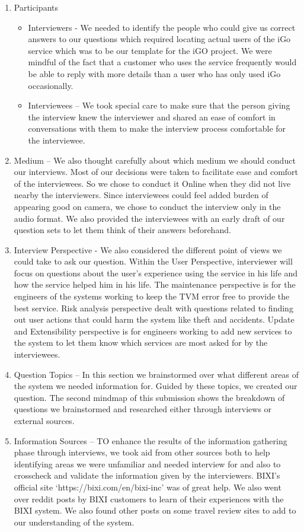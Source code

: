 \begin{enumerate}
    \item Participants
    \begin{itemize}
        \item Interviewers - We needed to identify the people who could give us correct answers to our questions which required locating actual users of the iGo service which was to be our template for the iGO project. We were mindful of the fact that a customer who uses the service frequently would be able to reply with more details than a user who has only used iGo occasionally.
        \item Interviewees – We took special care to make sure that the person giving the interview knew the interviewer and shared an ease of comfort in conversations with them to make the interview process comfortable for the interviewee.
    \end{itemize} 
    \item Medium – We also thought carefully about which medium we should conduct our interviews. Most of our decisions were taken to facilitate ease and comfort of the interviewees. So we chose to conduct it Online when they did not live nearby the interviewers. Since interviewees could feel added burden of appearing good on camera, we chose to conduct the interview only in the audio format. We also provided the interviewees with an early draft of our question sets to let them think of their answers beforehand.
    \item Interview Perspective -  We also considered the different point of views we could take to ask our question. Within the User Perspective, interviewer will focus on questions about the user’s experience using the service in his life and how the service helped him in his life. The maintenance perspective is for the engineers of the systems working to keep the TVM error free to provide the best service. Risk analysis perspective dealt with questions related to finding out user actions that could harm the system like theft and accidents. Update and Extensibility perspective is for engineers working to add new services to the system to let them know which services are most asked for by the interviewees.
    \item Question Topics – In this section we brainstormed over what different areas of the system we needed information for. Guided by these topics, we created our question. The second mindmap of this submission shows the breakdown of questions we brainstormed and researched either through interviews or external sources.
    \item Information Sources – TO enhance the results of the information gathering phase through interviews, we took aid from other sources both to help identifying areas we were unfamiliar and needed interview for and also to crosscheck and validate the information given by the interviewers. BIXI’s official site ‘https://bixi.com/en/bixi-inc’ was of great help. We also went over reddit posts by BIXI customers to learn of their experiences with the BIXI system. We also found other posts on some travel review sites to add to our understanding of the system.\cite{MindMap}
\end{enumerate}	

